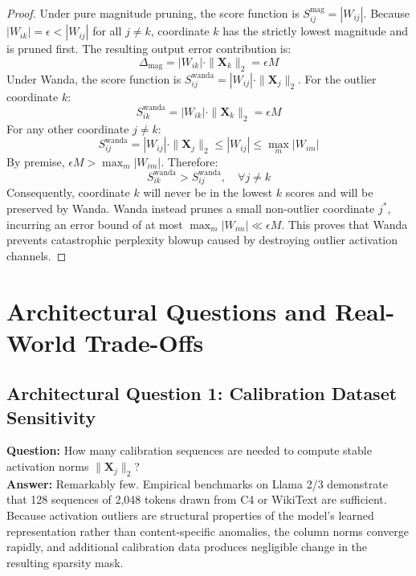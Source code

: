 \documentclass[11pt,a4paper]{article}
\theoremstyle{definition}
\begin{document}
\begin{proof}
Under pure magnitude pruning, the score function is $S_{ij}^{\text{mag}} = |W_{ij}|$.
Because $|W_{ik}| = \epsilon < |W_{ij}|$ for all $j \neq k$, coordinate $k$ has the strictly lowest magnitude and is pruned first. The resulting output error contribution is:
\begin{equation}
\Delta_{\text{mag}} = |W_{ik}| \cdot \|\mathbf{X}_k\|_2 = \epsilon M
\end{equation}
Under Wanda, the score function is $S_{ij}^{\text{wanda}} = |W_{ij}| \cdot \|\mathbf{X}_j\|_2$.
For the outlier coordinate $k$:
\begin{equation}
S_{ik}^{\text{wanda}} = |W_{ik}| \cdot \|\mathbf{X}_k\|_2 = \epsilon M
\end{equation}
For any other coordinate $j \neq k$:
\begin{equation}
S_{ij}^{\text{wanda}} = |W_{ij}| \cdot \|\mathbf{X}_j\|_2 \le |W_{ij}| \le \max_m |W_{im}|
\end{equation}
By premise, $\epsilon M > \max_m |W_{im}|$. Therefore:
\begin{equation}
S_{ik}^{\text{wanda}} > S_{ij}^{\text{wanda}}, \quad \forall j \neq k
\end{equation}
Consequently, coordinate $k$ will never be in the lowest $k$ scores and will be preserved by Wanda. Wanda instead prunes a small non-outlier coordinate $j^*$, incurring an error bound of at most $\max_m |W_{im}| \ll \epsilon M$. This proves that Wanda prevents catastrophic perplexity blowup caused by destroying outlier activation channels.
\end{proof}

\section{Architectural Questions and Real-World Trade-Offs}

\subsection{Architectural Question 1: Calibration Dataset Sensitivity}
\textbf{Question:} How many calibration sequences are needed to compute stable activation norms $\|\mathbf{X}_j\|_2$?\\
\textbf{Answer:} Remarkably few. Empirical benchmarks on Llama 2/3 demonstrate that 128 sequences of 2,048 tokens drawn from C4 or WikiText are sufficient. Because activation outliers are structural properties of the model's learned representation rather than content-specific anomalies, the column norms converge rapidly, and additional calibration data produces negligible change in the resulting sparsity mask.
\end{document}
